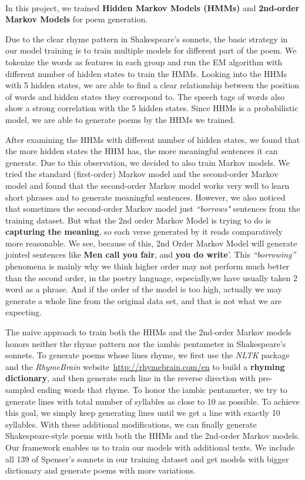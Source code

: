 %
\paragraph{}
In this project, we trained \textbf{Hidden Markov Models (HMMs)} and \textbf{2nd-order Markov Models} for poem generation.

Due to the clear rhyme pattern in Shakespeare's sonnets, the basic strategy in our model training is to train multiple models for different part of the poem. We tokenize the words as features in each group and run the EM algorithm with different number of hidden states to train the HMMs. Looking into the HHMs with 5 hidden states, we are able to find a clear relationship between the position of words and hidden states they correspond to. The speech tags of words also show a strong correlation with the 5 hidden states. Since HHMs is a probabilistic model, we are able to generate poems by the HHMs we trained. 

After examining the HHMs with different number of hidden states, we found that the more hidden states the HHM has, the more meaningful sentences it can generate. Due to this observation, we decided to also train Markov models. We tried the standard (first-order) Markov model and the second-order Markov model and found that the second-order Markov model works very well to learn short phrases and to generate meaningful sentences. However, we also noticed that sometimes the second-order Markov model just \textit{``borrows"} sentences from the training dataset. But what the 2nd order Markov Model is trying to do is \textbf{capturing the meaning}, so each verse generated by it reads comparatively more reasonable. We see, because of this, 2nd Order Markov Model will generate jointed sentences like \textbf{Men call you fair}, and \textbf{you do write}'. This \textit{``borrowing''} phenomena is mainly why we think higher order may not perform much better than the second order, in the poetry language, especially,we have usually taken 2 word as a phrase. And if the order of the model is too high, actually we may generate a whole line from the original data set, and that is not what we are expecting. 

The naive approach to train both the HHMs and the 2nd-order Markov models honors neither the rhyme pattern nor the iambic pentameter in Shakespeare's sonnets. To generate poems whose lines rhyme, we first use the \textit{NLTK} package and the \textit{RhymeBrain} website~\url{http://rhymebrain.com/en} to build a \textbf{rhyming dictionary}, and then generate each line in the reverse direction with pre-sampled ending words that rhyme. To honor the iambic pentameter, we try to generate lines with total number of syllables as close to 10 as possible. To achieve this goal, we simply keep generating lines until we get a line with exactly 10 syllables. With these additional modifications, we can finally generate Shakespeare-style poems with both the HHMs and the 2nd-order Markov models. Our framework enables us to train our models with additional texts. We include all 139 of Spenser's sonnets in our training dataset and get models with bigger dictionary and generate poems with more variations. 

